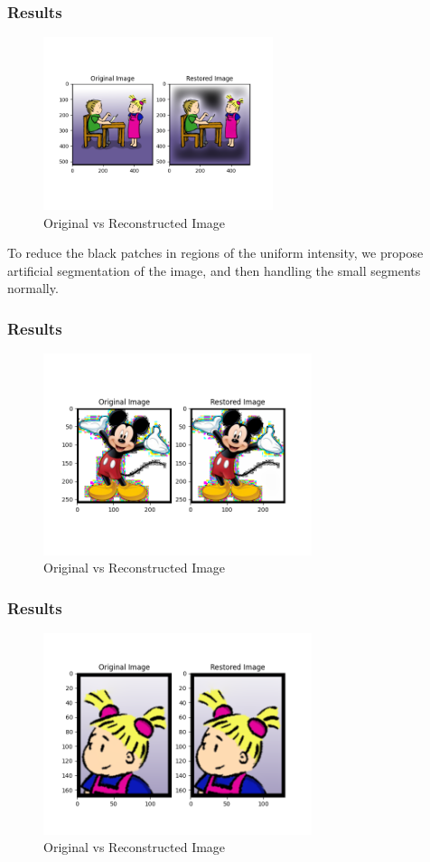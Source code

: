 \documentclass[Serif, 10pt, brown]{beamer}
\theoremstyle{example}
\theoremstyle{plain}
\begin{document}
\begin{frame}
	\frametitle{Results}
	\begin{figure}
		\centering
		\includegraphics[width=0.6\textwidth]{../results/try_11_1.png}
		\caption{Original vs Reconstructed Image}
	\end{figure}
	To reduce the black patches in regions of the uniform intensity, we propose artificial segmentation of the image, and then handling the small segments normally.
\end{frame}


\begin{frame}
	\frametitle{Results}
	\begin{figure}
		\centering
		\includegraphics[width=0.7\textwidth]{../results/try_11_2.png}
		\caption{Original vs Reconstructed Image}
	\end{figure}
\end{frame}


\begin{frame}
	\frametitle{Results}
	\begin{figure}
		\centering
		\includegraphics[width=0.7\textwidth]{../results/try_11_3.png}
		\caption{Original vs Reconstructed Image}
	\end{figure}
\end{frame}
\end{document}
